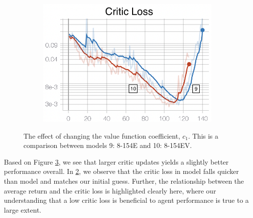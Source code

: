 \begin{figure}[hbt]
\begin{subfigure}[b]{0.32\textwidth}
         \caption{}
         \label{fig:5_training_ppo_vfcoeffActorLoss}
     \end{subfigure}
     \hfill
     \begin{subfigure}[b]{0.32\textwidth}
         \centering
         \includegraphics[width=\textwidth]{figures/5_/Training/ppo_vfcoeffCriticL.png}
         \caption{}
         \label{fig:5_training_ppo_vfcoeffCriticLoss}
     \end{subfigure}
    \captionsetup{justification=centering}
    \caption{The effect of changing the value function coefficient, $c_1$. This is a comparison between models 9: 8-154E and 10: 8-154EV.}
     \label{fig:5_training_ppo_vfcoeff}
\end{figure}
Based on Figure \ref{fig:5_training_ppo_vfcoeff}, we see that larger critic updates yields a slightly better performance overall. In \cref{fig:5_training_ppo_vfcoeffCriticLoss}, we observe that the critic loss in model \ten falls quicker than model \nine and matches our initial guess. Further, the relationship between the average return and the critic loss is highlighted clearly here, where our understanding that a low critic loss is beneficial to agent performance is true to a large extent.


